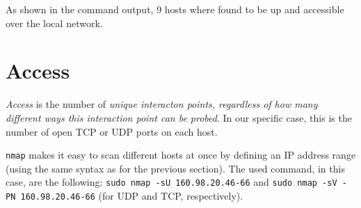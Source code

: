\documentclass[10pt,a4paper,twoside,onecolumn]{article}
\begin{document}
As shown in the command output, 9 hosts where found to be up and accessible over the local network.

\section{Access}

\textit{Access} is the number of \textit{unique interacton points, regardless of how many different ways this interaction point can be probed}. In our specific case, this is the number of open TCP or UDP ports on each host.

\texttt{nmap} makes it easy to scan different hosts at once by defining an IP address range (using the same syntax as for the previous section). The used command, in this case, are the following: \texttt{sudo nmap -sU 160.98.20.46-66} and \texttt{sudo nmap -sV -PN 160.98.20.46-66} (for UDP and TCP, respectively).
\end{document}
